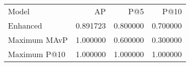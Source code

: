 \begin{tabular}{lrrr}
Model & AP & P@5 & P@10 \\
Enhanced & 0.891723 & 0.800000 & 0.700000 \\
Maximum MAvP & 1.000000 & 0.600000 & 0.300000 \\
Maximum P@10 & 1.000000 & 1.000000 & 1.000000 \\
\end{tabular}
